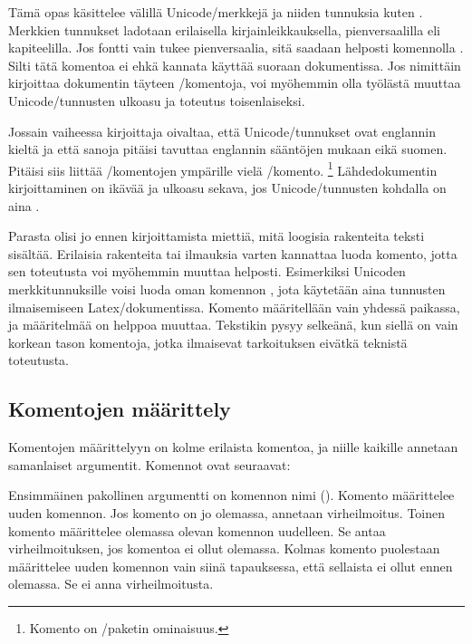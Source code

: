 Tämä opas käsittelee välillä Unicode\-/merkkejä ja niiden tunnuksia
kuten . Merkkien tunnukset
ladotaan erilaisella kirjainleikkauksella, pienversaalilla eli
kapiteelilla. Jos fontti vain tukee pienversaalia, sitä saadaan helposti
komennolla . Silti tätä komentoa ei ehkä kannata
käyttää suoraan dokumentissa. Jos nimittäin kirjoittaa dokumentin
täyteen \-/komentoja, voi myöhemmin olla työlästä
muuttaa Unicode\-/tunnusten ulko\-asu ja toteutus toisenlaiseksi.

Jossain vaiheessa kirjoittaja oivaltaa, että Unicode\-/tunnukset ovat
englannin kieltä ja että sanoja pitäisi tavuttaa englannin sääntöjen
mukaan eikä suomen. Pitäisi siis liittää \-/komentojen ympärille vielä \-/komento.%
\footnote{Komento  on
  \-/paketin ominaisuus.} Lähdedokumentin
kirjoittaminen on ikävää ja ulko\-asu sekava, jos Unicode\-/tunnusten
kohdalla on aina .

Parasta olisi jo ennen kirjoittamista miettiä, mitä loogisia rakenteita
teksti sisältää. Erilaisia rakenteita tai ilmauksia varten kannattaa
luoda komento, jotta sen toteutusta voi myöhemmin muuttaa helposti.
Esimerkiksi Unicoden merkkitunnuksille voisi luoda oman komennon
, jota käytetään aina tunnusten ilmaisemiseen
Latex\-/dokumentissa. Komento määritellään vain yhdessä paikassa, ja
määritelmää on helppoa muuttaa. Tekstikin pysyy selkeänä, kun siellä on
vain korkean tason komentoja, jotka ilmaisevat tarkoituksen eivätkä
teknistä toteutusta.

\subsection{Komentojen määrittely}
\label{luku:komennot-määr}

Komentojen määrittelyyn on kolme erilaista komentoa, ja niille kaikille
annetaan samanlaiset argumentit. Komennot ovat seuraavat:

\begin{koodilohkosis}
  \newcommand     {\nimi}[n][oletus]{määritelmä}
  \renewcommand   {\nimi}[n][oletus]{määritelmä}
  \providecommand {\nimi}[n][oletus]{määritelmä}
\end{koodilohkosis}

Ensimmäinen pakollinen argumentti on komennon nimi ().
Komento  määrittelee uuden komennon. Jos komento
on jo olemassa, annetaan virheilmoitus. Toinen komento  määrittelee olemassa olevan komennon uudelleen. Se antaa
virheilmoituksen, jos komentoa ei ollut olemassa. Kolmas komento
 puolestaan määrittelee uuden komennon vain
siinä tapauksessa, että sellaista ei ollut ennen olemassa. Se ei anna
virheilmoitusta.

